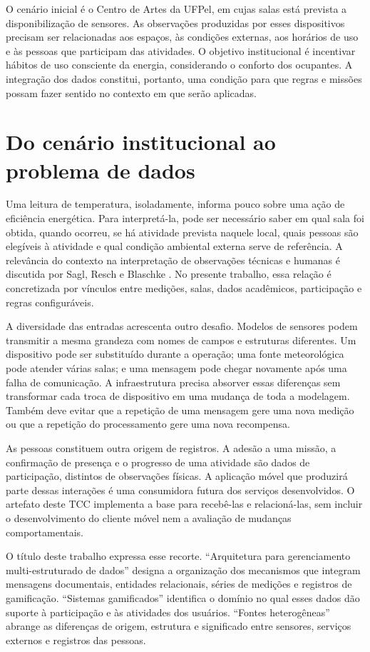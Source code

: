 \documentclass[tcc,capa]{texufpel}
\begin{document}
O cenário inicial é o Centro de Artes da UFPel, em cujas salas está prevista a disponibilização de sensores. As observações produzidas por esses dispositivos precisam ser relacionadas aos espaços, às condições externas, aos horários de uso e às pessoas que participam das atividades. O objetivo institucional é incentivar hábitos de uso consciente da energia, considerando o conforto dos ocupantes. A integração dos dados constitui, portanto, uma condição para que regras e missões possam fazer sentido no contexto em que serão aplicadas.

\section{Do cenário institucional ao problema de dados}
Uma leitura de temperatura, isoladamente, informa pouco sobre uma ação de eficiência energética. Para interpretá-la, pode ser necessário saber em qual sala foi obtida, quando ocorreu, se há atividade prevista naquele local, quais pessoas são elegíveis à atividade e qual condição ambiental externa serve de referência. A relevância do contexto na interpretação de observações técnicas e humanas é discutida por Sagl, Resch e Blaschke \cite{sagl2015}. No presente trabalho, essa relação é concretizada por vínculos entre medições, salas, dados acadêmicos, participação e regras configuráveis.

A diversidade das entradas acrescenta outro desafio. Modelos de sensores podem transmitir a mesma grandeza com nomes de campos e estruturas diferentes. Um dispositivo pode ser substituído durante a operação; uma fonte meteorológica pode atender várias salas; e uma mensagem pode chegar novamente após uma falha de comunicação. A infraestrutura precisa absorver essas diferenças sem transformar cada troca de dispositivo em uma mudança de toda a modelagem. Também deve evitar que a repetição de uma mensagem gere uma nova medição ou que a repetição do processamento gere uma nova recompensa.

As pessoas constituem outra origem de registros. A adesão a uma missão, a confirmação de presença e o progresso de uma atividade são dados de participação, distintos de observações físicas. A aplicação móvel que produzirá parte dessas interações é uma consumidora futura dos serviços desenvolvidos. O artefato deste TCC implementa a base para recebê-las e relacioná-las, sem incluir o desenvolvimento do cliente móvel nem a avaliação de mudanças comportamentais.

O título deste trabalho expressa esse recorte. ``Arquitetura para gerenciamento multi-estruturado de dados'' designa a organização dos mecanismos que integram mensagens documentais, entidades relacionais, séries de medições e registros de gamificação. ``Sistemas gamificados'' identifica o domínio no qual esses dados dão suporte à participação e às atividades dos usuários. ``Fontes heterogêneas'' abrange as diferenças de origem, estrutura e significado entre sensores, serviços externos e registros das pessoas.
\end{document}

